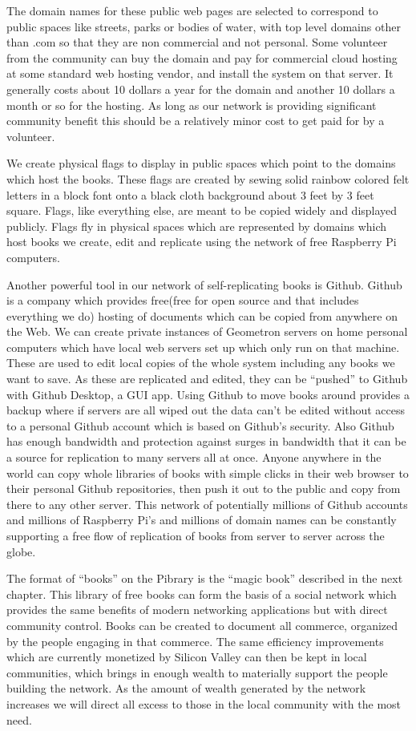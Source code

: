 The domain names for these public web pages are selected to correspond
to public spaces like streets, parks or bodies of water, with top level
domains other than .com so that they are non commercial and not
personal. Some volunteer from the community can buy the domain and pay
for commercial cloud hosting at some standard web hosting vendor, and
install the system on that server. It generally costs about 10 dollars a
year for the domain and another 10 dollars a month or so for the
hosting. As long as our network is providing significant community
benefit this should be a relatively minor cost to get paid for by a
volunteer.

We create physical flags to display in public spaces which point to the
domains which host the books. These flags are created by sewing solid
rainbow colored felt letters in a block font onto a black cloth
background about 3 feet by 3 feet square. Flags, like everything else,
are meant to be copied widely and displayed publicly. Flags fly in
physical spaces which are represented by domains which host books we
create, edit and replicate using the network of free Raspberry Pi
computers.

Another powerful tool in our network of self-replicating books is
Github. Github is a company which provides free(free for open source and
that includes everything we do) hosting of documents which can be copied
from anywhere on the Web. We can create private instances of Geometron
servers on home personal computers which have local web servers set up
which only run on that machine. These are used to edit local copies of
the whole system including any books we want to save. As these are
replicated and edited, they can be ``pushed'' to Github with Github
Desktop, a GUI app. Using Github to move books around provides a backup
where if servers are all wiped out the data can't be edited without
access to a personal Github account which is based on Github's security.
Also Github has enough bandwidth and protection against surges in
bandwidth that it can be a source for replication to many servers all at
once. Anyone anywhere in the world can copy whole libraries of books
with simple clicks in their web browser to their personal Github
repositories, then push it out to the public and copy from there to any
other server. This network of potentially millions of Github accounts
and millions of Raspberry Pi's and millions of domain names can be
constantly supporting a free flow of replication of books from server to
server across the globe.

The format of ``books'' on the Pibrary is the ``magic book'' described
in the next chapter. This library of free books can form the basis of a
social network which provides the same benefits of modern networking
applications but with direct community control. Books can be created to
document all commerce, organized by the people engaging in that
commerce. The same efficiency improvements which are currently monetized
by Silicon Valley can then be kept in local communities, which brings in
enough wealth to materially support the people building the network. As
the amount of wealth generated by the network increases we will direct
all excess to those in the local community with the most need.

